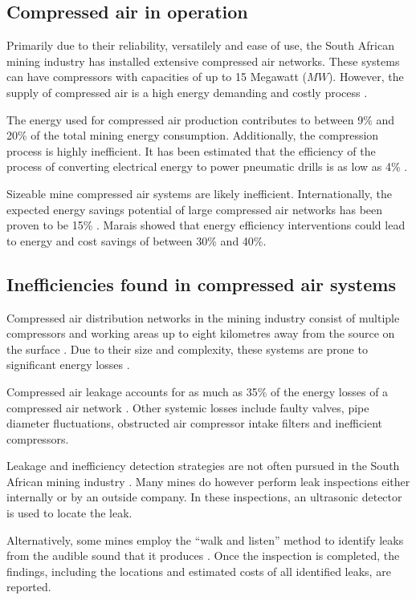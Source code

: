 	\subsection{Compressed air in operation}\label{key}
		Primarily due to their reliability, versatilely and ease of use, the South African mining industry has installed extensive compressed air networks. These systems can have compressors with capacities of up to 15 Megawatt ($MW$)\cite{Marais2012PhD}. However, the supply of compressed air is a high energy demanding and costly process \cite{padachi2009energy}.
		\par 
		The energy used for compressed air production contributes to between 9\% and 20\% of the total mining energy consumption\footnotemark[1] \cite{du2011development}. Additionally, the compression process is highly inefficient. It has been estimated that the efficiency of the process of converting electrical energy to power pneumatic drills is as low as 4\% \cite{fraser2008saving}.
		\par
		Sizeable mine compressed air systems are likely inefficient. Internationally, the expected energy savings potential of large compressed air networks has been proven to be 15\% \cite{neale2009compressed}. Marais \cite{marais2013simplification} showed that energy efficiency interventions could lead to energy and cost savings of between 30\% and 40\%. 
		
	\subsection{Inefficiencies found in compressed air systems}
		Compressed air distribution networks in the mining industry consist of multiple compressors and working areas up to eight kilometres away from the source on the surface . Due to their size and complexity, these systems are prone to significant energy losses \cite{Marais2012PhD}.
		\par 
		Compressed air leakage accounts for as much as 35\% of the energy losses of a compressed air network \cite{Lawrence2004Improving}. Other systemic losses include faulty valves, pipe diameter fluctuations, obstructed air compressor intake filters and inefficient compressors. 	
		\par
		Leakage and inefficiency detection strategies are not often pursued in the South African mining industry \cite{vanTonder2010Masters}. Many mines do however perform leak inspections either internally or by an outside company. In these inspections, an ultrasonic detector is used to locate the leak. 
		\par 
		Alternatively, some mines employ the \enquote{walk and listen} method to identify leaks from the audible sound that it produces \cite{vanTonder2010Masters}. Once the inspection is completed, the findings, including the locations and estimated costs of all identified leaks, are reported.
		

